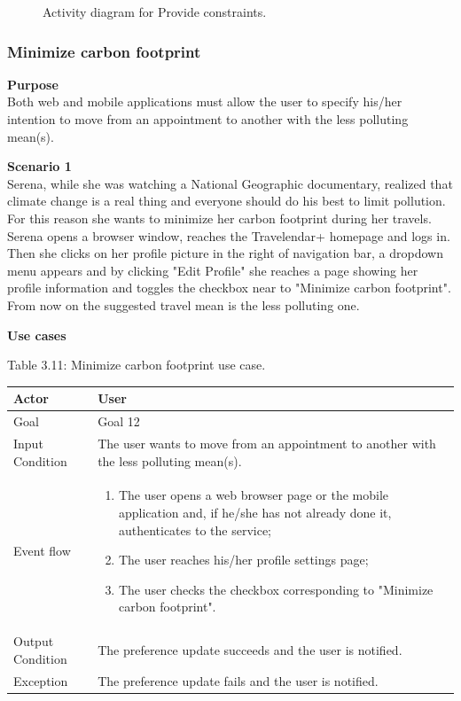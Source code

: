 \documentclass{article}
\begin{document}
\begin{figure}[h!]
		\caption{Activity diagram for Provide constraints.}
	\end{figure}


	\subsubsection{Minimize carbon footprint}
	
	\bigskip
	\noindent
	\textbf{Purpose} \\
	Both web and mobile applications must allow the user to specify his/her intention to move from an appointment to another with the less polluting mean(s).
	
	\bigskip
	\noindent
	\textbf{Scenario 1} \\
	Serena, while she was watching a National Geographic documentary, realized that climate change is a real thing and everyone should do his best to limit pollution. For this reason she wants to minimize her carbon footprint during her travels. Serena opens a browser window, reaches the Travelendar+ homepage and logs in. Then she clicks on her profile picture in the right of navigation bar, a dropdown menu appears and by clicking "Edit Profile" she reaches a page showing her profile information and toggles the checkbox near to "Minimize carbon footprint". From now on the suggested travel mean is the less polluting one.
	
	\bigskip
	\noindent
	\textbf{Use cases} \\
	
	\begin{center}
		Table 3.11: Minimize carbon footprint use case.
		
		\bigskip
   		\begin{tabular}{p{}|p{}}
   		 	\hline
    			Actor & User \\ \hline
    			Goal & Goal 12 \\ \hline
    			Input Condition & The user wants to move from an appointment to another with the less polluting mean(s). \\ \hline
    			Event flow & 
			\begin{enumerate}
  				\item The user opens a web browser page or the mobile application and, if he/she has not already done it, authenticates to the service;
				\item The user reaches his/her profile settings page;
				\item The user checks the checkbox corresponding to "Minimize carbon footprint".
 			 \end{enumerate} \\ \hline
    			Output Condition & The preference update succeeds and the user is notified. \\ \hline
    			Exception & The preference update fails and the user is notified. \\ \hline
    		\end{tabular}
	\end{center}
	
\end{document}
